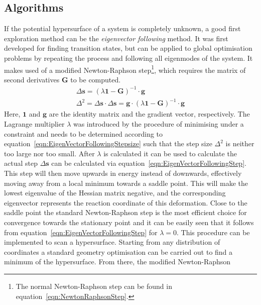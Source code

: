 \subsection{Algorithms}
\label{sec:GOAlgorithms}

If the potential hypersurface of a system is completely unknown, a good first
exploration method can be the \textit{eigenvector following} method. It was
first developed for finding transition
states\autocite{Cerjan_findingtransitionstates_1981}, but can be applied to
global optimisation problems by repeating the process and following all
eigenmodes of the system. It makes used of a modified Newton-Raphson
step\footnote{The normal Newton-Raphson step can be found in
equation~\ref{eqn:NewtonRaphsonStep}.}, which requires the matrix of second
derivatives $\mathbf{G}$ to be computed.
%
\begin{align}
    \Delta \mathbf{s}=\left(\lambda\mathbf{1}-\mathbf{G}\right)^{-1}\cdot\mathbf{g}\label{eqn:EigenVectorFollowingStep}\\
    \Delta^2=\Delta \mathbf{s}\cdot\Delta \mathbf{s}=\mathbf{g}\cdot\left(\lambda\mathbf{1}-\mathbf{G}\right)^{-1}\cdot\mathbf{g}\label{eqn:EigenVectorFollowingStepsize}
\end{align}
%
Here, $\mathbf{1}$ and $\mathbf{g}$ are the identity matrix and the gradient
vector, respectively. The Lagrange multiplier $\lambda$ was introduced by the
procedure of minimising under a constraint and needs to be determined according
to equation~\ref{eqn:EigenVectorFollowingStepsize} such that the step size
$\Delta^2$ is neither too large nor too small. After $\lambda$ is calculated it
can be used to calculate the actual step $\Delta\mathbf{s}$ can be calculated
via equation~\ref{eqn:EigenVectorFollowingStep}. This step will then move
upwards in energy instead of downwards, effectively moving away from a local
minimum towards a saddle point. This will make the lowest eigenvalue of the
Hessian matrix negative, and the corresponding eigenvector represents the
reaction coordinate of this deformation. Close to the saddle point the standard
Newton-Raphson step is the most efficient choice for convergence towards the
stationary point and it can be easily seen that it follows from
equation~\ref{eqn:EigenVectorFollowingStep} for $\lambda=0$. This procedure can
be implemented to scan a
hypersurface.\autocite{Wales_EnergyLandscapesClusters_2000} Starting from any
distribution of coordinates a standard geometry optimisation can be carried out
to find a minimum of the hypersurface. From there, the modified Newton-Raphson
